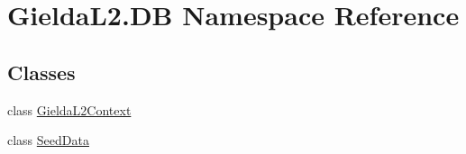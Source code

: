 \hypertarget{namespace_gielda_l2_1_1_d_b}{}\section{Gielda\+L2.\+DB Namespace Reference}
\label{namespace_gielda_l2_1_1_d_b}
\subsection*{Classes}
\begin{DoxyCompactItemize}
\item 
class \mbox{\hyperlink{class_gielda_l2_1_1_d_b_1_1_gielda_l2_context}{Gielda\+L2\+Context}}
\item 
class \mbox{\hyperlink{class_gielda_l2_1_1_d_b_1_1_seed_data}{Seed\+Data}}
\end{DoxyCompactItemize}
